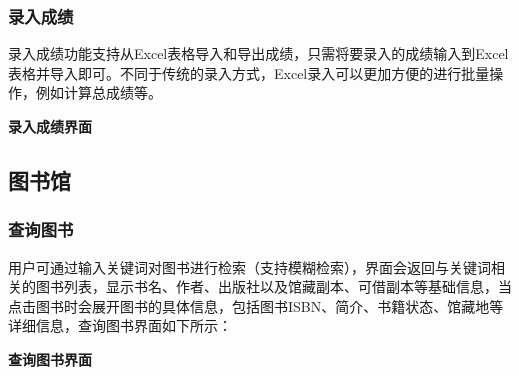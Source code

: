 \documentclass{article}
\begin{document}
\subsubsection{录入成绩}
录入成绩功能支持从Excel表格导入和导出成绩，只需将要录入的成绩输入到Excel表格并导入即可。不同于传统的录入方式，Excel录入可以更加方便的进行批量操作，例如计算总成绩等。
\begin{center}
\textbf{录入成绩界面}
\end{center}


\subsection{图书馆}

\subsubsection{查询图书}
用户可通过输入关键词对图书进行检索（支持模糊检索），界面会返回与关键词相关的图书列表，显示书名、作者、出版社以及馆藏副本、可借副本等基础信息，当点击图书时会展开图书的具体信息，包括图书ISBN、简介、书籍状态、馆藏地等详细信息，查询图书界面如下所示：

\begin{center}
\textbf{查询图书界面}
\end{center}
\end{document}
